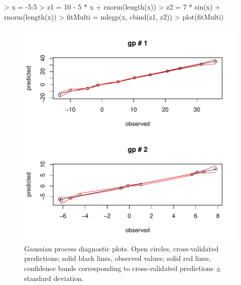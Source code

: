 \begin{Schunk}
\begin{Sinput}
> x = -5:5
> z1 = 10 - 5 * x + rnorm(length(x))
> z2 = 7 * sin(x) + rnorm(length(x))
> fitMulti = mlegp(x, cbind(z1, z2))
> plot(fitMulti)
\end{Sinput}
\end{Schunk}
\begin{figure}[htbp]
  \begin{center}
\includegraphics{gp_ex-003}
    \caption{Gaussian process diagnostic plots. Open circles, cross-validated predictions; solid black lines, observed values; solid red lines, confidence bands corresponding to cross-validated predictions $\pm$ standard deviation.}
    \label{fig:diag1}
  \end{center}
\end{figure}


